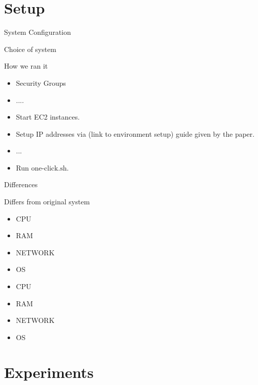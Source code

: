\documentclass[notes, xcolor=dvipsnames]{beamer}
\begin{document}
    

    \section{Setup}

    \begin{frame}{System Configuration}

        Choice of system

    \end{frame}

    \begin{frame}{How we ran it}

        \begin{itemize}
            \item Security Groups
            \item .... 
            \item Start EC2 instances.
            \item Setup IP addresses via (link to environment setup) guide given by the paper.
            \item ... 
            \item Run $\text{one-click}.\text{sh}$.
        \end{itemize}

    \end{frame}

    \begin{frame}{Differences}

        Differs from original system
        \begin{multicols}{2}
            \begin{itemize}
                \item CPU 
                \item RAM 
                \item NETWORK
                \item OS 
                \item CPU 
                \item RAM
                \item NETWORK
                \item OS 
            \end{itemize}      
        \end{multicols}

    \end{frame}

    \section{Experiments}
\end{document}
